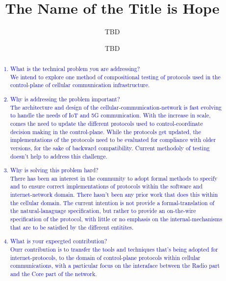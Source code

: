 \documentclass[acmsmall,review,authorversion]{acmart}
\begin{document}
\title{The Name of the Title is Hope}

\author{TBD}
\author{TBD}


\begin{abstract}

\textcolor{blue}{
\begin{enumerate}
  \item What is the technical problem you are addressing?\\
  We intend to explore one method of compositional testing of protocols used in the control-plane of cellular communication infrastructure. 
  \item Why is addressing the problem important? \\
The architecture and design of the cellular-communication-network is fast evolving to handle the needs of IoT and 5G communication. With the increase in scale, comes the need to update the different protocols used to control-coordinate decision making in the control-plane. While the protocols get updated, the implementations of the protocols need to be evaluated for compliance with older versions, for the sake of backward compatibility. Current methodoly of testing doesn't help to address this challenge. 
\item Why is solving this problem hard? \\
There has been an interest in the community to adopt formal methods to specify and to ensure correct implementations of protocols within the software and internet-network domain. There hasn't been any prior work that does this within the cellular domain. The current intention is not provide a formal-translation of the natural-lanaguage specification, but rather to provide an on-the-wire specification of the protocol, with little or no emphasis on the internal-mechanisms that are to be satisfied by the different entitites. 
\item What is your expecgted contribution?\\
Ourr contribution is to transfer the tools and techniques that's being adopted for internet-protocols, to the domain of control-plane protocols within cellular communications, with a particular focus on the interaface between the Radio part and the Core part of the network. 
\end{enumerate}
}


\end{abstract}
\end{document}
